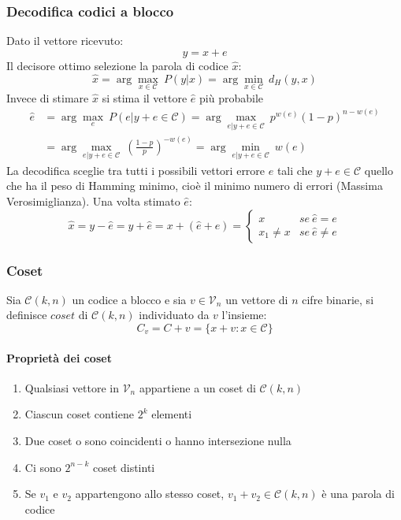         \subsubsection{Decodifica codici a blocco}
            Dato il vettore ricevuto:
            \[
                y = x+e
            \]
            Il decisore ottimo selezione la parola di codice $\hat{x}$:
            \[
                \hat{x} = \arg \underset{x\in\mathcal{C}}{\max}\ P(y|x) = \arg \underset{x\in\mathcal{C}}{\min}\ d_H(y,x)   
            \]
            Invece di stimare $\hat{x}$ si stima il vettore $\hat{e}$ più probabile
            \begin{align}
                \hat{e} &= \arg \underset{e}{\max}\ P(e|y+e\in\mathcal{C}) = \arg \underset{e|y+e\in\mathcal{C}}{\max}\ p^{w(e)}(1-p)^{n-w(e)} \nonumber \\
                        &= \arg \underset{e|y+e\in\mathcal{C}}{\max}\ \left(\frac{1-p}{p}\right)^{-w(e)} = \arg \underset{e|y+e\in\mathcal{C}}{\min}\ w(e)  \nonumber 
            \end{align}
            La decodifica sceglie tra tutti i possibili vettori errore $e$ tali che $y+e\in\mathcal{C}$ quello che ha il peso di Hamming minimo, cioè il minimo numero di 
            errori (Massima Verosimiglianza). Una volta stimato $\hat{e}$:
            \[
                \hat{x} = y-\hat{e} = y+\hat{e} = x+(\hat{e}+e)=
                \begin{cases}
                    x &se\ \hat{e} = e\nonumber\\    
                    x_1\neq x &se\ \hat{e} \neq e\nonumber    
                \end{cases}     
            \]
        \subsubsection{Coset}
            Sia $\mathcal{C}(k,n)$ un codice a blocco e sia $v\in \mathcal{V}_n$ un vettore di $n$ cifre binarie, si definisce $coset$ di
            $\mathcal{C}(k,n)$ individuato da $v$ l'insieme:
            \[
                C_v = C+v=\{ x+v: x\in\mathcal{C} \}
            \]
            \paragraph{Proprietà dei coset}
            \begin{enumerate}
                \item {Qualsiasi vettore in $\mathcal{V}_n$ appartiene a un coset di $\mathcal{C}(k,n)$}
                \item {Ciascun coset contiene $2^k$ elementi}
                \item {Due coset o sono coincidenti o hanno intersezione nulla}
                \item {Ci sono $2^{n-k}$ coset distinti}
                \item {Se $v_1$ e $v_2$ appartengono allo stesso coset, $v_1 + v_2 \in \mathcal{C}(k,n)$ è una parola di codice}
            \end{enumerate}
